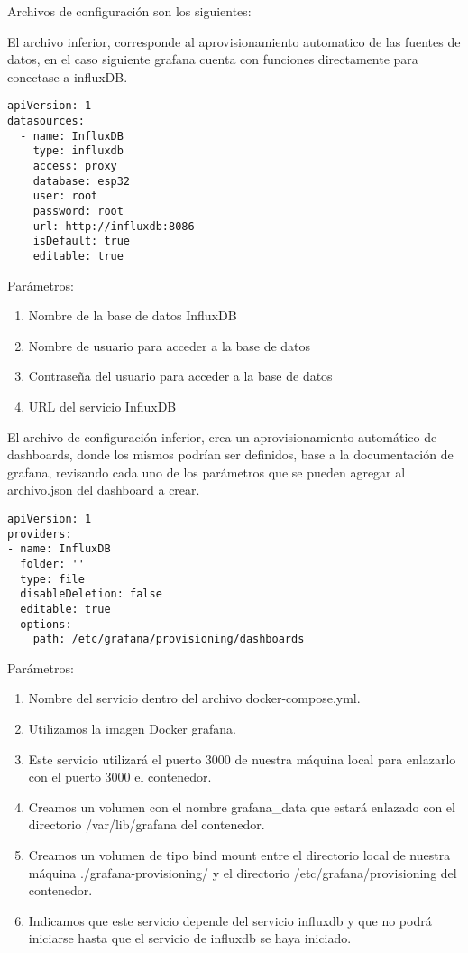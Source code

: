 Archivos de configuración son los siguientes:

El archivo inferior, corresponde al aprovisionamiento automatico de las fuentes
de datos, en el caso siguiente grafana cuenta con funciones directamente para
conectase a influxDB.
\begin{verbatim}
apiVersion: 1
datasources:
  - name: InfluxDB
    type: influxdb
    access: proxy
    database: esp32 
    user: root 
    password: root 
    url: http://influxdb:8086 
    isDefault: true
    editable: true
\end{verbatim}
Parámetros: 
\begin{enumerate}
  \item Nombre de la base de datos InfluxDB
  \item Nombre de usuario para acceder a la base de datos
  \item Contraseña del usuario para acceder a la base de datos
  \item URL del servicio InfluxDB
\end{enumerate}

El archivo de configuración inferior, crea un aprovisionamiento automático de
dashboards, donde los mismos podrían ser definidos, base a la documentación de
grafana, revisando cada uno de los parámetros que se pueden agregar al
archivo.json del dashboard a crear.
    


\begin{verbatim}
apiVersion: 1
providers:
- name: InfluxDB
  folder: ''
  type: file
  disableDeletion: false
  editable: true
  options:
    path: /etc/grafana/provisioning/dashboards
\end{verbatim}

Parámetros: 
\begin{enumerate}
  \item Nombre del servicio dentro del archivo docker-compose.yml.
  \item Utilizamos la imagen Docker grafana.
  \item Este servicio utilizará el puerto 3000 de nuestra máquina local para
    enlazarlo con el puerto 3000 el contenedor.
  \item Creamos un volumen con el nombre grafana\_data que estará enlazado con
    el directorio /var/lib/grafana del contenedor.
  \item Creamos un volumen de tipo bind mount entre el directorio local de
    nuestra máquina ./grafana-provisioning/ y el directorio
    /etc/grafana/provisioning del contenedor.
  \item Indicamos que este servicio depende del servicio influxdb y que no
    podrá iniciarse hasta que el servicio de influxdb se haya iniciado.
\end{enumerate}


